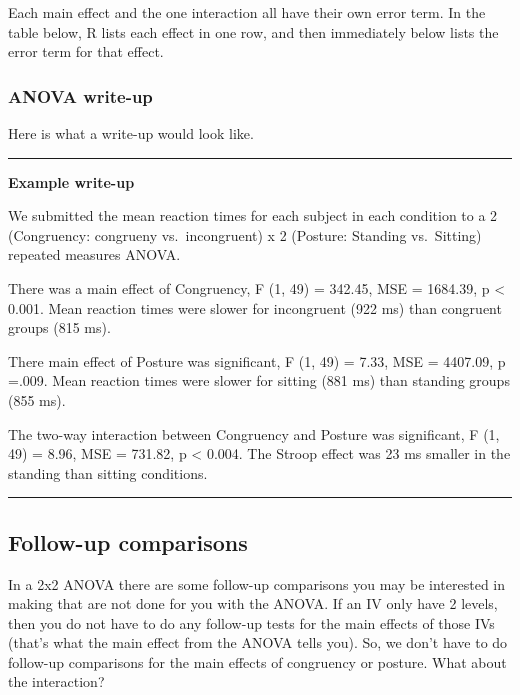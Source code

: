 \documentclass[]{book}
\theoremstyle{definition}
\theoremstyle{definition}
\theoremstyle{definition}
\theoremstyle{remark}
\begin{document}
Each main effect and the one interaction all have their own error term.
In the table below, R lists each effect in one row, and then immediately
below lists the error term for that effect.

\subsubsection{ANOVA write-up}\label{anova-write-up-1}

Here is what a write-up would look like.

\begin{center}\rule{0.5\linewidth}{\linethickness}\end{center}

\textbf{Example write-up}

We submitted the mean reaction times for each subject in each condition
to a 2 (Congruency: congrueny vs.~incongruent) x 2 (Posture: Standing
vs.~Sitting) repeated measures ANOVA.

There was a main effect of Congruency, F (1, 49) = 342.45, MSE =
1684.39, p \textless{} 0.001. Mean reaction times were slower for
incongruent (922 ms) than congruent groups (815 ms).

There main effect of Posture was significant, F (1, 49) = 7.33, MSE =
4407.09, p =.009. Mean reaction times were slower for sitting (881 ms)
than standing groups (855 ms).

The two-way interaction between Congruency and Posture was significant,
F (1, 49) = 8.96, MSE = 731.82, p \textless{} 0.004. The Stroop effect
was 23 ms smaller in the standing than sitting conditions.

\begin{center}\rule{0.5\linewidth}{\linethickness}\end{center}

\subsection{Follow-up comparisons}\label{follow-up-comparisons-1}

In a 2x2 ANOVA there are some follow-up comparisons you may be
interested in making that are not done for you with the ANOVA. If an IV
only have 2 levels, then you do not have to do any follow-up tests for
the main effects of those IVs (that's what the main effect from the
ANOVA tells you). So, we don't have to do follow-up comparisons for the
main effects of congruency or posture. What about the interaction?
\end{document}
